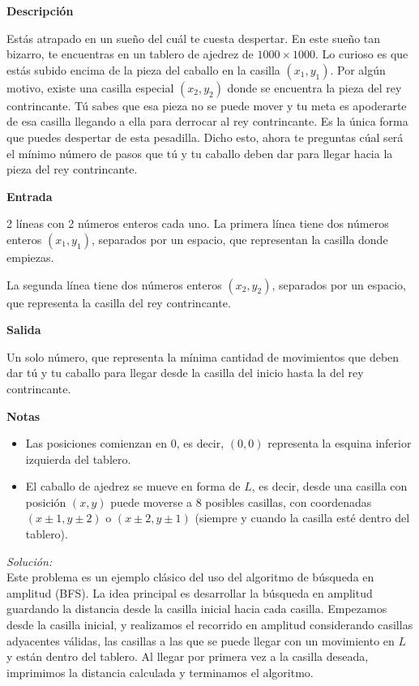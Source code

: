\documentclass[11pt]{article}
\newcommand{\s}{\textit{Soluci\'on: }}
\begin{document}
\textbf{Descripción}

Estás atrapado en un sueño del cuál te cuesta despertar. En este sueño tan bizarro, te encuentras en un tablero de ajedrez de $1000 \times 1000$. Lo curioso es que estás subido encima de la pieza del caballo en la casilla $(x_1, y_1)$. Por algún motivo, existe una casilla especial  $(x_2, y_2)$ donde se encuentra la pieza del rey contrincante. Tú sabes que esa pieza no se puede mover y tu meta es apoderarte de esa casilla llegando a ella para derrocar al rey contrincante. Es la única forma que puedes despertar de esta pesadilla. Dicho esto, ahora te preguntas cúal será el mínimo número de pasos que tú y tu caballo deben dar para llegar hacia la pieza del rey contrincante.

\textbf{Entrada}

2 líneas con 2 números enteros cada uno. La primera línea tiene dos números enteros $(x_1, y_1)$, separados por un espacio, que representan la casilla donde empiezas.

La segunda línea tiene dos números enteros $(x_2, y_2)$, separados por un espacio, que representa la casilla del rey contrincante.

\textbf{Salida}

Un solo número, que representa la mínima cantidad de movimientos que deben dar tú y tu caballo para llegar desde la casilla del inicio hasta la del rey contrincante.


\textbf{Notas}
\begin{itemize}
\item Las posiciones comienzan en 0, es decir, $(0, 0)$ representa la esquina inferior izquierda del tablero.

\item El caballo de ajedrez se mueve en forma de $L$, es decir, desde una casilla con posición $(x, y)$ puede moverse a 8 posibles casillas, con coordenadas $(x \pm 1, y \pm 2)$  o $(x \pm 2, y \pm 1)$ (siempre y cuando la casilla esté dentro del tablero).
\end{itemize}

\s
\\
Este problema es un ejemplo clásico del uso del algoritmo de búsqueda en amplitud (BFS). La idea principal es desarrollar la búsqueda en amplitud guardando la distancia desde la casilla inicial hacia cada casilla. Empezamos desde la casilla inicial, y realizamos el recorrido en amplitud considerando casillas adyacentes válidas, las casillas a las que se puede llegar con un movimiento en $L$ y están dentro del tablero. Al llegar por primera vez a la casilla deseada, imprimimos la distancia calculada y terminamos el algoritmo.
\end{document}
